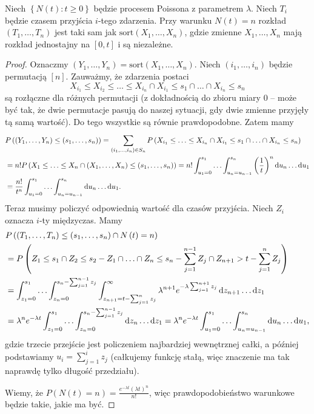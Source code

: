 \begin{theorem}
    Niech \(\left\{ N\left( t  \right) : t\ge 0 \right\} \) będzie procesem Poissona z parametrem \(\lambda\). Niech \(T_i\) będzie czasem przyjścia \(i\)-tego zdarzenia. Przy warunku \(N\left( t  \right) = n \) rozkład \(\left( T_1,\ldots,T_n \right) \) jest taki sam jak \(\mathrm{sort}\left( X_1,\ldots,X_n \right) \), gdzie zmienne \(X_1,\ldots,X_n\) mają rozkład jednostajny na \([0,t]\) i są niezależne.
\end{theorem}
\begin{proof}
    Oznaczmy \(\left( Y_1,\ldots,Y_n \right) = \mathrm{sort}\left( X_1,\ldots,X_n \right) \). Niech \(\left( i_1,\ldots,i_n \right) \) będzie permutacją \([n]\). Zauważmy, że zdarzenia postaci
        \[ X_{i_1} \le X_{i_2} \le \ldots \le X_{i_n} \cap X_{i_1} \le s_1 \cap \ldots \cap X_{i_n}\le s_n \]
        są rozłączne dla różnych permutacji (z dokładnością do zbioru miary \(0\) -- może być tak, że dwie permutacje pasują do naszej sytuacji, gdy dwie zmienne przyjęły tą samą wartość). Do tego wszystkie są równie prawdopodobne. Zatem mamy
    \begin{align*}
        &P\left( \left( Y_1,\ldots,Y_n \right) \le \left( s_1,\ldots,s_n \right)  \right)  = \sum_{\left( i_1,\ldots,i_n \right) \in S_n}^{} P\left( X_{i_1}\le \ldots\le X_{i_n} \cap X_{i_1} \le s_1 \cap \ldots \cap X_{i_n}\le s_n \right) \\
        &= n! P\left( X_1\le \ldots\le X_n \cap \left( X_1,\ldots,X_n \right) \le \left( s_1,\ldots,s_n \right)  \right) = n!\int_{u_1=0}^{s_1} \ldots \int_{u_n=u_{n-1}}^{s_n} \left( \frac{1}{t} \right) ^{n} \mathop{}\!\mathrm{d}{u_n} \ldots \mathop{}\!\mathrm{d}{u_{1}} \\ 
        &= \frac{n!}{t ^{n}} \int_{u_1=0}^{s_1} \ldots \int_{u_n=u_{n-1}}^{s_n} \mathop{}\!\mathrm{d}{u_n} \ldots\mathop{}\!\mathrm{d}{u_1} .
    \end{align*}
    Teraz musimy policzyć odpowiednią wartość dla czasów przyjścia. Niech \(Z_i\) oznacza \(i\)-ty międzyczas. Mamy
    \begin{align*}
        &P\left( \left( T_1,\ldots,T_n \right) \le \left( s_1,\ldots,s_n \right) \cap  N\left( t  \right) = n \right) \\ 
        &= P\left( Z_1\le s_1 \cap Z_2\le s_2-Z_1 \cap \ldots\cap Z_n \le s_n - \sum_{j=1}^{n-1} Z_j \cap Z_{n+1} > t- \sum_{j=1}^{n} Z_j \right) \\ 
        &= \int_{z_1=0}^{s_1} \ldots \int_{z_n=0}^{s_n - \sum_{j=1}^{n-1} z_j} \int_{z_{n+1}= t - \sum_{j=1}^{n} z_j}^{\infty} \lambda^{n+1}e^{-\lambda \sum_{j=1}^{n+1} z_j} \mathop{}\!\mathrm{d}{z_{n+1}} \ldots\mathop{}\!\mathrm{d}{z_1}   \\ 
        &= \lambda^{n} e^{-\lambda t } \int_{z_1=0}^{s_1} \ldots \int_{z_n=0}^{s_n - \sum_{j=1}^{n-1} z_j} \mathop{}\!\mathrm{d}{z_n} \ldots \mathop{}\!\mathrm{d}{z_1} = \lambda^{n}e^{-\lambda t } \int_{u_1=0}^{s_1} \ldots \int_{u_n = u_{n-1}}^{s_n} \mathop{}\!\mathrm{d}{u_n} \ldots\mathop{}\!\mathrm{d}{u_1} ,
    \end{align*}
    gdzie trzecie przejście jest policzeniem najbardziej wewnętrznej całki, a później podstawiamy \(u_i = \sum_{j=1}^{i} z_j\) (całkujemy funkcję stałą, więc znaczenie ma tak naprawdę tylko długość przedziału).

    Wiemy, że \(P\left( N\left( t  \right) = n  \right) = \frac{e^{-\lambda t }\left( \lambda t  \right) ^{n}}{n!}\), więc prawdopodobieństwo warunkowe będzie takie, jakie ma być.
\end{proof}

